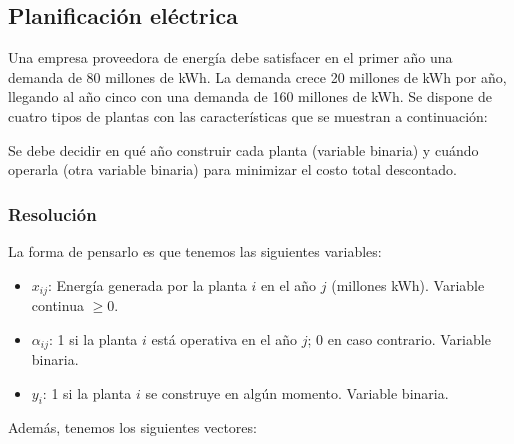 \documentclass[12pt]{article}
\begin{document}
\subsection{Planificación eléctrica}
Una empresa proveedora de energía debe satisfacer en el primer año una demanda de 80 millones de kWh. La demanda crece 20 millones de kWh por año, llegando al año cinco con una demanda de 160 millones de kWh. Se dispone de cuatro tipos de plantas con las características que se muestran a continuación:

\begin{table}[H]
    \centering
\end{table}

Se debe decidir en qué año construir cada planta (variable binaria) y cuándo operarla (otra variable binaria) para minimizar el costo total descontado.

\subsubsection{Resolución}

La forma de pensarlo es que tenemos las siguientes variables:

\begin{itemize}[label=$\rightarrow$]
    \item $x_{ij}$: Energía generada por la planta $i$ en el año $j$ (millones kWh). Variable continua $\ge 0$.
    \item $\alpha_{ij}$: 1 si la planta $i$ está operativa en el año $j$; 0 en caso contrario. Variable binaria.
    \item $y_i$: 1 si la planta $i$ se construye en algún momento. Variable binaria.
\end{itemize}

Además, tenemos los siguientes vectores:
\end{document}
